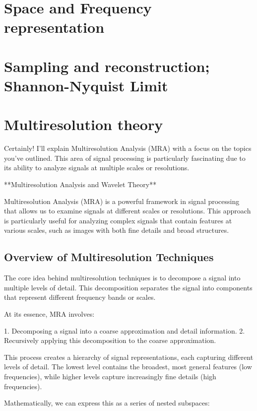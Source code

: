 \section{Space and Frequency representation}


\section{Sampling and reconstruction; Shannon-Nyquist Limit} 

\section{Multiresolution theory}

Certainly! I'll explain Multiresolution Analysis (MRA) with a focus on the topics you've outlined. This area of signal processing is particularly fascinating due to its ability to analyze signals at multiple scales or resolutions.

**Multiresolution Analysis and Wavelet Theory**

Multiresolution Analysis (MRA) is a powerful framework in signal processing that allows us to examine signals at different scales or resolutions. This approach is particularly useful for analyzing complex signals that contain features at various scales, such as images with both fine details and broad structures.

\subsection{Overview of Multiresolution Techniques}

The core idea behind multiresolution techniques is to decompose a signal into multiple levels of detail. This decomposition separates the signal into components that represent different frequency bands or scales.

At its essence, MRA involves:

1. Decomposing a signal into a coarse approximation and detail information.
2. Recursively applying this decomposition to the coarse approximation.

This process creates a hierarchy of signal representations, each capturing different levels of detail. The lowest level contains the broadest, most general features (low frequencies), while higher levels capture increasingly fine details (high frequencies).

Mathematically, we can express this as a series of nested subspaces:

